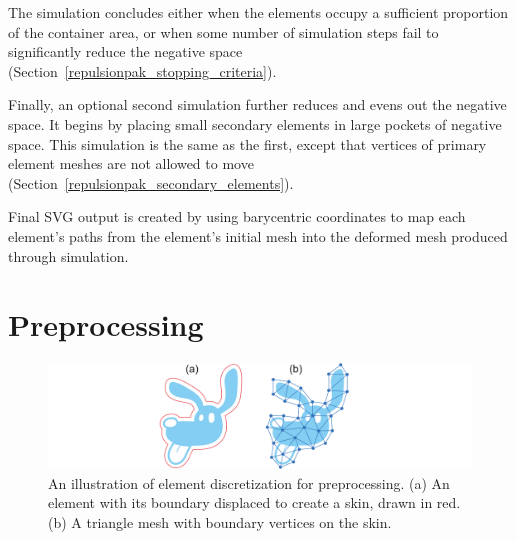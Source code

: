 The simulation concludes 
either when the elements occupy a sufficient proportion of the container area, or 
when some number of simulation steps fail to
significantly reduce the negative space
(Section~\ref{repulsionpak_stopping_criteria}).


Finally, an optional second simulation further reduces and evens out the
negative space.  It begins by placing small secondary elements in large
pockets of negative space.  This simulation is the same as the
first, except that vertices of primary element meshes are not allowed to move
(Section~\ref{repulsionpak_secondary_elements}).

Final SVG output is created by using barycentric coordinates to map each element's
paths from the element's initial mesh into the deformed mesh produced through
simulation.


\section{Preprocessing}
\label{repulsionpak_preprocessing}

\begin{figure}[t] %
\centering
\includegraphics[width=1.0\textwidth]{figures/repulsionpak/element_skin_triangles_2.pdf}
\caption[Element discretization]{
	\label{fig_elements_image}
	An illustration of element discretization for preprocessing.
	(a) An element with its boundary displaced to create a skin, drawn in red.
	(b) A triangle mesh with boundary vertices on the skin.
}
\end{figure}

